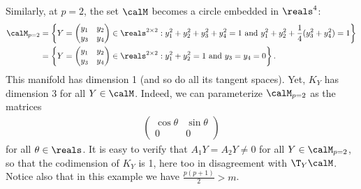 \documentclass{article}
\newcommand{\1}{\mathbf{1}}
\begin{document}
Similarly, at $p = 2$, the set $\calM$ becomes a circle embedded in $\reals^4$:
\begin{align*}
\calM_{p=2} & = \left\{ Y = \begin{pmatrix}
y_1 & y_2 \\ y_3 & y_4
\end{pmatrix} \in \reals^{2\times 2} : y_1^2 + y_2^2 + y_3^2 + y_4^2 = 1 \textrm{ and } y_1^2 + y_2^2 + \frac{1}{4}(y_3^2 + y_4^2) = 1 \right\} \\
& = \left\{ Y = \begin{pmatrix}
y_1 & y_2 \\ y_3 & y_4
\end{pmatrix} \in \reals^{2\times 2} : y_1^2 + y_2^2 = 1 \textrm{ and } y_3 = y_4 = 0 \right\}.
\end{align*}
This manifold has dimension 1 (and so do all its tangent spaces). Yet, $K_Y$ has dimension 3 for all $Y \in \calM$. Indeed, we can parameterize $\calM_{p=2}$ as the matrices
\begin{align*}
\begin{pmatrix}
\cos\theta & \sin\theta \\ 0 & 0
\end{pmatrix}
\end{align*}
for all $\theta \in \reals$. It is easy to verify that $A_1Y = A_2Y \neq 0$ for all $Y\in\calM_{p=2}$, so that the codimension of $K_Y$ is 1, here too in disagreement with $\T_Y\calM$. Notice also that in this example we have $\frac{p(p+1)}{2} > m$.

\end{document}
